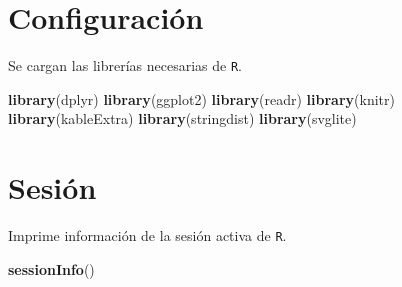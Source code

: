 \documentclass[
]{book}
\newenvironment{Shaded}{\begin{snugshade}}{\end{snugshade}}
\newcommand{\KeywordTok}[1]{\textcolor[rgb]{0.13,0.29,0.53}{\textbf{#1}}}
\newcommand{\NormalTok}[1]{#1}
\begin{document}
\hypertarget{configuraciuxf3n}{%
\section{Configuración}\label{configuraciuxf3n}}

Se cargan las librerías necesarias de \texttt{R}.

\begin{Shaded}
\begin{Highlighting}[]
\KeywordTok{library}\NormalTok{(dplyr)}
\KeywordTok{library}\NormalTok{(ggplot2)}
\KeywordTok{library}\NormalTok{(readr)}
\KeywordTok{library}\NormalTok{(knitr)}
\KeywordTok{library}\NormalTok{(kableExtra)}
\KeywordTok{library}\NormalTok{(stringdist)}
\KeywordTok{library}\NormalTok{(svglite)}
\end{Highlighting}
\end{Shaded}

\hypertarget{sesiuxf3n}{%
\section{Sesión}\label{sesiuxf3n}}

Imprime información de la sesión activa de \texttt{R}.

\begin{Shaded}
\begin{Highlighting}[]
\KeywordTok{sessionInfo}\NormalTok{()}
\end{Highlighting}
\end{Shaded}
\end{document}
